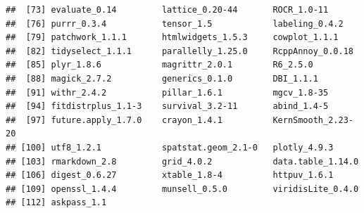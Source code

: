 \documentclass[]{article}
\begin{document}
\begin{verbatim}
##  [73] evaluate_0.14         lattice_0.20-44       ROCR_1.0-11          
##  [76] purrr_0.3.4           tensor_1.5            labeling_0.4.2       
##  [79] patchwork_1.1.1       htmlwidgets_1.5.3     cowplot_1.1.1        
##  [82] tidyselect_1.1.1      parallelly_1.25.0     RcppAnnoy_0.0.18     
##  [85] plyr_1.8.6            magrittr_2.0.1        R6_2.5.0             
##  [88] magick_2.7.2          generics_0.1.0        DBI_1.1.1            
##  [91] withr_2.4.2           pillar_1.6.1          mgcv_1.8-35          
##  [94] fitdistrplus_1.1-3    survival_3.2-11       abind_1.4-5          
##  [97] future.apply_1.7.0    crayon_1.4.1          KernSmooth_2.23-20   
## [100] utf8_1.2.1            spatstat.geom_2.1-0   plotly_4.9.3         
## [103] rmarkdown_2.8         grid_4.0.2            data.table_1.14.0    
## [106] digest_0.6.27         xtable_1.8-4          httpuv_1.6.1         
## [109] openssl_1.4.4         munsell_0.5.0         viridisLite_0.4.0    
## [112] askpass_1.1
\end{verbatim}
\end{document}
